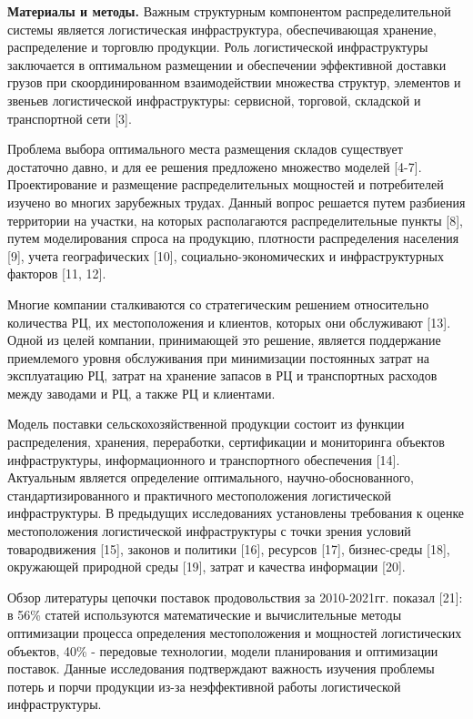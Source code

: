 {\bfseries Материалы и методы.} Важным структурным компонентом
распределительной системы является логистическая инфраструктура,
обеспечивающая хранение, распределение и торговлю продукции. Роль
логистической инфраструктуры заключается в оптимальном размещении и
обеспечении эффективной доставки грузов при скоординированном
взаимодействии множества структур, элементов и звеньев логистической
инфраструктуры: сервисной, торговой, складской и транспортной сети
{[}3{]}.

Проблема выбора оптимального места размещения складов существует
достаточно давно, и для ее решения предложено множество моделей
{[}4-7{]}. Проектирование и размещение распределительных мощностей и
потребителей изучено во многих зарубежных трудах. Данный вопрос решается
путем разбиения территории на участки, на которых располагаются
распределительные пункты {[}8{]}, путем моделирования спроса на
продукцию, плотности распределения населения {[}9{]}, учета
географических {[}10{]}, социально-экономических и инфраструктурных
факторов {[}11, 12{]}.

Многие компании сталкиваются со стратегическим решением относительно
количества РЦ, их местоположения и клиентов, которых они обслуживают
{[}13{]}. Одной из целей компании, принимающей это решение, является
поддержание приемлемого уровня обслуживания при минимизации постоянных
затрат на эксплуатацию РЦ, затрат на хранение запасов в РЦ и
транспортных расходов между заводами и РЦ, а также РЦ и клиентами.

Модель поставки сельскохозяйственной продукции состоит из функции
распределения, хранения, переработки, сертификации и мониторинга
объектов инфраструктуры, информационного и транспортного обеспечения
{[}14{]}. Актуальным является определение оптимального,
научно-обоснованного, стандартизированного и практичного местоположения
логистической инфраструктуры. В предыдущих исследованиях установлены
требования к оценке местоположения логистической инфраструктуры с точки
зрения условий товародвижения {[}15{]}, законов и политики {[}16{]},
ресурсов {[}17{]}, бизнес-среды {[}18{]}, окружающей природной среды
{[}19{]}, затрат и качества информации {[}20{]}.

Обзор литературы цепочки поставок продовольствия за 2010-2021гг. показал
{[}21{]}: в 56\% статей используются математические и вычислительные
методы оптимизации процесса определения местоположения и мощностей
логистических объектов, 40\% - передовые технологии, модели планирования
и оптимизации поставок. Данные исследования подтверждают важность
изучения проблемы потерь и порчи продукции из-за неэффективной работы
логистической инфраструктуры.

